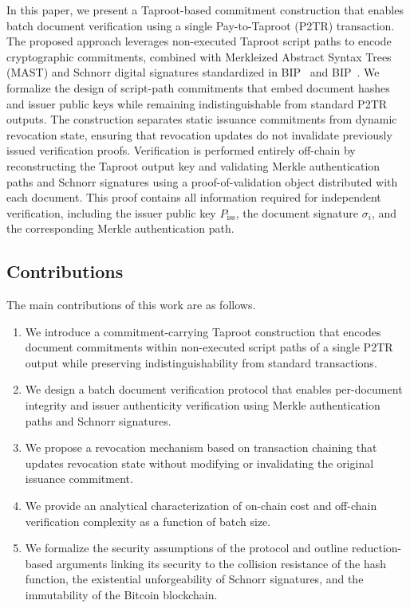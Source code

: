 \documentclass{ieeeaccess}
\begin{document}
In this paper, we present a Taproot-based commitment construction that enables batch document verification using a single Pay-to-Taproot (P2TR) transaction.
The proposed approach leverages non-executed Taproot script paths to encode cryptographic commitments, combined with Merkleized Abstract Syntax Trees (MAST) and Schnorr digital signatures standardized in BIP~\cite{taproot} and BIP~\cite{bip340}.
We formalize the design of script-path commitments that embed document hashes and issuer public keys while remaining indistinguishable from standard P2TR outputs.
The construction separates static issuance commitments from dynamic revocation state, ensuring that revocation updates do not invalidate previously issued verification proofs.
Verification is performed entirely off-chain by reconstructing the Taproot output key and validating Merkle authentication paths and Schnorr signatures using a proof-of-validation object distributed with each document.
This proof contains all information required for independent verification, including the issuer public key $P_{\mathrm{iss}}$, the document signature $\sigma_i$, and the corresponding Merkle authentication path.


\subsection{Contributions}

The main contributions of this work are as follows.

\begin{enumerate}
    \item We introduce a commitment-carrying Taproot construction that encodes document commitments within non-executed script paths of a single P2TR output while preserving indistinguishability from standard transactions.
    \item We design a batch document verification protocol that enables per-document integrity and issuer authenticity verification using Merkle authentication paths and Schnorr signatures.
    \item We propose a revocation mechanism based on transaction chaining that updates revocation state without modifying or invalidating the original issuance commitment.
    \item We provide an analytical characterization of on-chain cost and off-chain verification complexity as a function of batch size.
    \item We formalize the security assumptions of the protocol and outline reduction-based arguments linking its security to the collision resistance of the hash function, the existential unforgeability of Schnorr signatures, and the immutability of the Bitcoin blockchain.
\end{enumerate}
\end{document}
